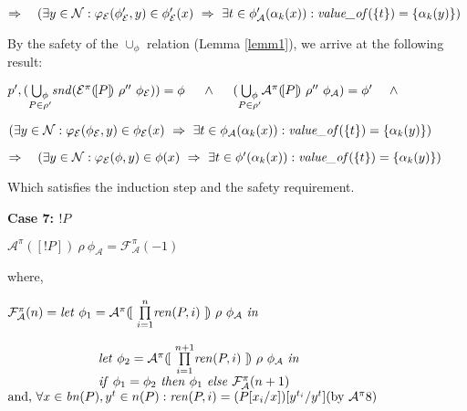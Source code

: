 \documentclass[10pt,a4paper,final,oneside,fleqn]{book}
\begin{document}
\noindent
$\Rightarrow~~~(\exists y\in\mathcal{N}:\varphi_\mathcal{E}(\phi'_\mathcal{E},y)\in\phi'_\mathcal{E}(x)~\Rightarrow~\exists t\in\phi'_\mathcal{A}(\alpha_k(x)):\mbox{{\itshape value\_of\/}}(\{t\})=\{\alpha_k(y)\})$\vspace{5mm}

\noindent
By the safety of the $\cup_\phi$ relation (Lemma \ref{lemm1}), we arrive at the following result:

\noindent
$p',(\underset{P\in\rho'}{\bigcup_\phi}\mbox{{\itshape snd\/}}(\mathcal{E}^\pi(\![P]\!)~\rho''~\phi_{\mathcal{E}}))=\phi~~~~\wedge~~~~(\underset{P\in\rho'}{\bigcup_\phi}\mathcal{A}^\pi(\![P]\!)~\rho''~\phi_{\mathcal{A}})=\phi'~~~~\wedge\vspace{3mm}$

\noindent
$(\exists y\in\mathcal{N}:\varphi_\mathcal{E}(\phi_\mathcal{E},y)\in\phi_\mathcal{E}(x)~\Rightarrow~\exists t\in\phi_\mathcal{A}(\alpha_k(x)):\mbox{{\itshape value\_of\/}}(\{t\})=\{\alpha_k(y)\})$\vspace{5mm}

\noindent
$\Rightarrow~~~(\exists y\in\mathcal{N}:\varphi_\mathcal{E}(\phi,y)\in\phi(x)~\Rightarrow~\exists t\in\phi'(\alpha_k(x)):\mbox{{\itshape value\_of\/}}(\{t\})=\{\alpha_k(y)\})$\vspace{5mm}

\noindent
Which satisfies the induction step and the safety requirement.\vspace{5mm}

\noindent
{\bf Case 7: $!P$}

\noindent
$\mathcal{A}^\pi(\![!P]\!)~\rho~\phi_\mathcal{A}=\mathcal{F}_\mathcal{A}^\pi(-1)$

\noindent
where,

\noindent
$\mathcal{F}_\mathcal{A}^\pi(n)=\mbox{{\itshape let\/} }\phi_1=\mathcal{A}^\pi(\![~\underset{i=1}{\overset{n}{\prod}}\mbox{{\itshape ren\/}}(P,i)~]\!)~\rho~\phi_\mathcal{A}\mbox{ {\itshape in\/}}$

\noindent
$\hspace{25mm}\mbox{{\itshape let\/} }\phi_2=\mathcal{A}^\pi(\![~\underset{i=1}{\overset{n+1}{\prod}}\mbox{{\itshape ren\/}}(P,i)~]\!)~\rho~\phi_\mathcal{A}\mbox{ {\itshape in\/}}$\\
$\hspace{25mm}\mbox{{\itshape if\/} }\phi_1=\phi_2\mbox{ {\itshape then\/} }\phi_1\mbox{ {\itshape else\/} }\mathcal{F}_\mathcal{A}^\pi(n+1)$\\
$\mbox{and, }\forall x\in\mbox{{\itshape bn\/}}(P),y^t\in n(P):\mbox{{\itshape ren\/}}(P,i)=(P[x_i/x])[y^{t_i}/y^t]\hfill(\mbox{by }\mathcal{A}^{\pi}8)$\vspace{5mm}
\end{document}
